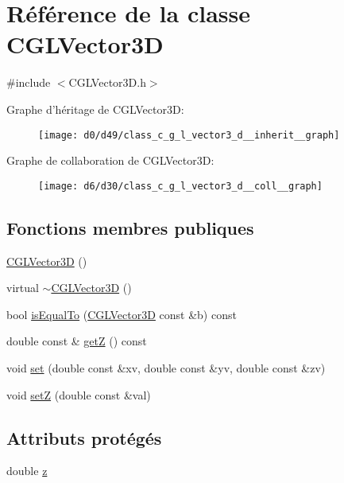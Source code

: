 \hypertarget{class_c_g_l_vector3_d}{\section{Référence de la classe C\-G\-L\-Vector3\-D}
\label{class_c_g_l_vector3_d}
}


{\ttfamily \#include $<$C\-G\-L\-Vector3\-D.\-h$>$}



Graphe d'héritage de C\-G\-L\-Vector3\-D\-:
\nopagebreak
\begin{figure}[H]
\begin{center}
\leavevmode
\texttt{[image: d0/d49/class\_c\_g\_l\_vector3\_d\_\_inherit\_\_graph]}
\end{center}
\end{figure}


Graphe de collaboration de C\-G\-L\-Vector3\-D\-:
\nopagebreak
\begin{figure}[H]
\begin{center}
\leavevmode
\texttt{[image: d6/d30/class\_c\_g\_l\_vector3\_d\_\_coll\_\_graph]}
\end{center}
\end{figure}
\subsection*{Fonctions membres publiques}
\begin{DoxyCompactItemize}
\item 
\hyperlink{class_c_g_l_vector3_d_a23c221e455e1b5e4733c0e9baf68c1f3}{C\-G\-L\-Vector3\-D} ()
\item 
virtual \hyperlink{class_c_g_l_vector3_d_ae7a23a5f882bbdd9489f51ddc86b0f02}{$\sim$\-C\-G\-L\-Vector3\-D} ()
\item 
bool \hyperlink{class_c_g_l_vector3_d_a339da32afa5a535aec027aba6b92e9b5}{is\-Equal\-To} (\hyperlink{class_c_g_l_vector3_d}{C\-G\-L\-Vector3\-D} const \&b) const 
\item 
double const \& \hyperlink{class_c_g_l_vector3_d_a374bca193aae71220f1349a6ab0778ee}{get\-Z} () const 
\item 
void \hyperlink{class_c_g_l_vector3_d_a15014f4427c214f64699590591cacc8f}{set} (double const \&xv, double const \&yv, double const \&zv)
\item 
void \hyperlink{class_c_g_l_vector3_d_afef476ba51f4f45cb9d64e5d6c1592a4}{set\-Z} (double const \&val)
\end{DoxyCompactItemize}
\subsection*{Attributs protégés}
\begin{DoxyCompactItemize}
\item 
double \hyperlink{class_c_g_l_vector3_d_af16926d21ef4bddbc2524d2604e049b3}{z}
\end{DoxyCompactItemize}


